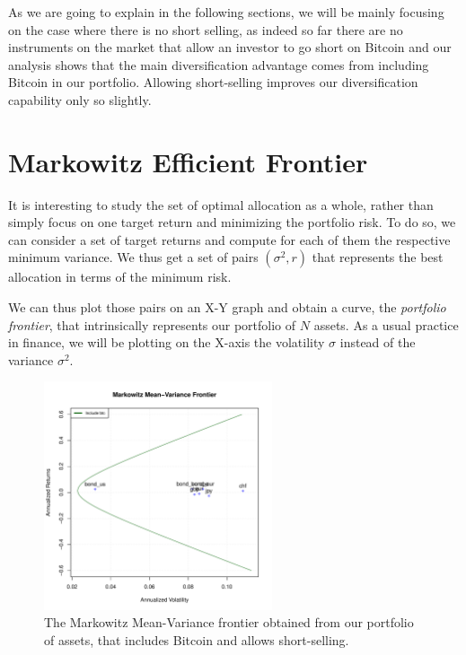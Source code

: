 As we are going to explain in the following sections, we will be mainly focusing on the case where there is no short selling, as indeed so far there are no instruments on the market that allow an investor to go short on Bitcoin and our analysis shows that the main diversification advantage comes from including Bitcoin in our portfolio. Allowing short-selling improves our diversification capability only so slightly.



\section{Markowitz Efficient Frontier}
\label{sec:markowitz_frontier}

It is interesting to study the set of optimal allocation as a whole, rather than simply focus on one target return and minimizing the portfolio risk.
To do so, we can consider a set of target returns and compute for each of them the respective minimum variance. We thus get a set of pairs $(\sigma^2, r)$ that represents the best allocation in terms of the minimum risk.

We can thus plot those pairs on an X-Y graph and obtain a curve, the \textit{portfolio frontier}, that intrinsically represents our portfolio of $N$ assets.
As a usual practice in finance, we will be plotting on the X-axis the volatility $\sigma$ instead of the variance $\sigma^2$.

\begin{figure}
	\centering
	\includegraphics[width=0.6\textwidth]{Images/full_frontier.pdf}
	\caption[Full Markowitz Efficient Frontier]{The Markowitz Mean-Variance frontier obtained from our portfolio of assets, that includes Bitcoin and allows short-selling.}
	\label{fig:full_frontier}
\end{figure}

